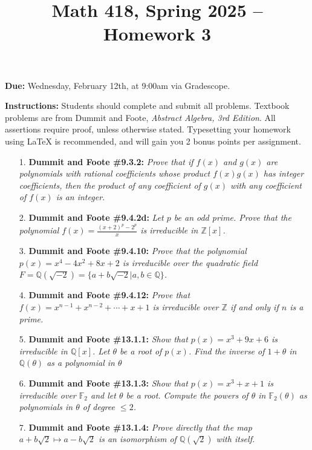 \documentclass[12pt]{article}
\title{Math 418, Spring 2025 -- Homework 3}
\date{}
\newcommand{\Z}{\mathbb{Z}}
\newcommand{\Q}{\mathbb{Q}}
\newcommand{\F}{\mathbb{F}}
\begin{document}
 \maketitle
\vspace{-80pt}

\textbf{Due:} Wednesday, February 12th, at 9:00am via Gradescope.

\textbf{Instructions:} Students should complete and submit all problems. Textbook problems are from Dummit and Foote, \emph{Abstract Algebra, 3rd Edition}. All assertions require proof, unless otherwise stated. Typesetting your homework using LaTeX is recommended, and will gain you 2 bonus points per assignment.

\begin{enumerate}

\item[1.] \textbf{Dummit and Foote \#9.3.2:} \textit{Prove that if $f(x)$ and $g(x)$ are polynomials with rational coefficients whose product $f(x)g(x)$ has integer coefficients, then the product of any coefficient of $g(x)$ with any coefficient of $f(x)$ is an integer.}

\item[2.] \textbf{Dummit and Foote \#9.4.2d:} \textit{Let $p$ be an odd prime. Prove that the polynomial $f(x) = \frac{(x+2)^p - 2^p}{x}$ is irreducible in $\Z[x]$.}

\item[3.] \textbf{Dummit and Foote \#9.4.10:} \textit{Prove that the polynomial $p(x) = x^4 - 4x^2 + 8x + 2$ is irreducible over the quadratic field $F = \Q(\sqrt{-2}) = \{a + b\sqrt{-2} | a, b \in \Q\}$.}

\item[4.] \textbf{Dummit and Foote \#9.4.12:} \textit{Prove that $f(x) = x^{n-1} + x^{n-2} + \cdots + x + 1$ is irreducible over $\Z$ if and only if $n$ is a prime.}

\item[5.] \textbf{Dummit and Foote \#13.1.1:} \textit{Show that $p(x) = x^3 + 9x +6$ is irreducible in $\Q[x]$. Let $\theta$ be a root of $p(x)$. Find the inverse of $1+\theta$ in $\Q(\theta)$ as a polynomial in $\theta$}

\item[6.] \textbf{Dummit and Foote \#13.1.3:} \textit{Show that $p(x) = x^3+x+1$ is irreducible over $\F_2$ and let $\theta$ be a root. Compute the powers of $\theta$ in $\F_2(\theta)$ as polynomials in $\theta$ of degree $\le 2$.}

\item[7.] \textbf{Dummit and Foote \#13.1.4:} \textit{Prove directly that the map $a+b\sqrt{2}\mapsto a-b\sqrt{2}$ is an isomorphism of $\Q(\sqrt{2})$ with itself.}

\end{enumerate}
\end{document}
